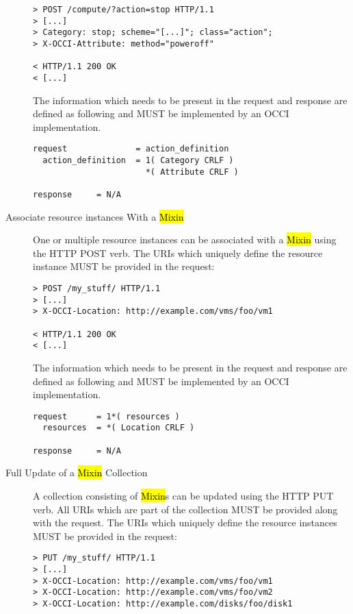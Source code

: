 \documentclass[10pt,a4paper]{article}
\begin{document}
\begin{description}
\begin{verbatim}
> POST /compute/?action=stop HTTP/1.1
> [...]
> Category: stop; scheme="[...]"; class="action";
> X-OCCI-Attribute: method="poweroff"

< HTTP/1.1 200 OK
< [...]
\end{verbatim}

    The information which needs to be present in the request and
    response are defined as following and MUST be implemented by an
    OCCI implementation.

\begin{verbatim}
request              = action_definition
  action_definition  = 1( Category CRLF )
                       *( Attribute CRLF )

response     = N/A
\end{verbatim}

  \item[Associate resource instances With a \hl{Mixin}] One or
    multiple resource instances can be associated with a \hl{Mixin}
    using the HTTP POST verb. The URIs which uniquely define the
    resource instance MUST be provided in the request:

\begin{verbatim}
> POST /my_stuff/ HTTP/1.1
> [...]
> X-OCCI-Location: http://example.com/vms/foo/vm1

< HTTP/1.1 200 OK
< [...]
\end{verbatim}

    The information which needs to be present in the request and
    response are defined as following and MUST be implemented by an
    OCCI implementation.

\begin{verbatim}
request      = 1*( resources )
  resources  = *( Location CRLF )

response     = N/A
\end{verbatim}

  \item[Full Update of a \hl{Mixin} Collection] A
    collection consisting of \hl{Mixin}s can be updated
    using the HTTP PUT verb. All URIs which are part of the
    collection MUST be provided along with the request. The URIs which
    uniquely define the resource instances MUST be provided in the
    request:

\begin{verbatim}
> PUT /my_stuff/ HTTP/1.1
> [...]
> X-OCCI-Location: http://example.com/vms/foo/vm1
> X-OCCI-Location: http://example.com/vms/foo/vm2
> X-OCCI-Location: http://example.com/disks/foo/disk1


\end{verbatim}
\end{description}
\end{document}
